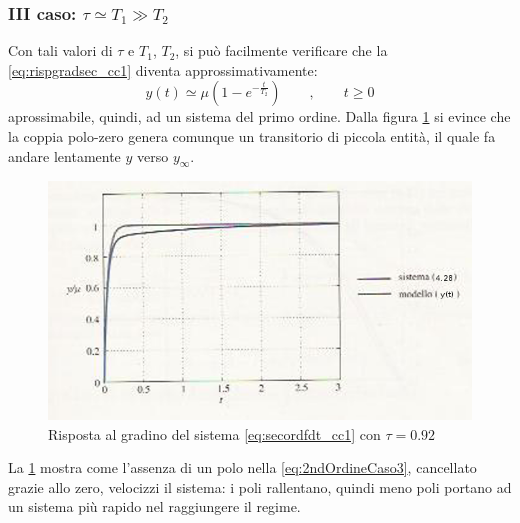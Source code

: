 \documentclass[a4paper]{report}
\begin{document}
\subsubsection{III caso: $\tau \simeq T_1\gg T_2$}
Con tali valori di $\tau$ e $T_1$, $T_2$, si pu\`o facilmente verificare
che la \ref{eq:rispgradsec_cc1} diventa approssimativamente:
\begin{equation}\label{eq:2ndOrdineCaso3}
  y(t)\simeq \mu (1 - e^{-\frac{t}{T_2}})\qquad , \qquad t\geq0
\end{equation}
aprossimabile, quindi, ad un sistema del primo ordine. Dalla figura
\ref{fig:risp5} si evince che la coppia polo-zero 
genera comunque un transitorio di piccola entit\`a, il quale fa andare
lentamente $y$ verso $y_\infty$. 
\begin{figure}[!h]\label{fig:risp5}
  \begin{center}
    \includegraphics[scale=0.5]{./figures/rispscal5.png}
    \caption{Risposta al gradino del sistema \ref{eq:secordfdt_cc1} con
      $\tau=0.92$}
  \end{center}
\end{figure} 
La \ref{fig:risp5} mostra come l'assenza di un polo nella \ref{eq:2ndOrdineCaso3},
cancellato grazie allo zero, velocizzi il sistema: i poli rallentano,
quindi meno poli portano ad un sistema pi\`u rapido nel raggiungere il
regime. 
\end{document}
